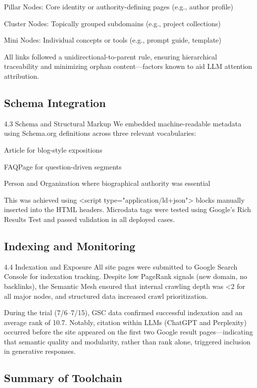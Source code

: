 Pillar Nodes: Core identity or authority-defining pages (e.g., author profile)

Cluster Nodes: Topically grouped subdomains (e.g., project collections)

Mini Nodes: Individual concepts or tools (e.g., prompt guide, template)

All links followed a unidirectional-to-parent rule, ensuring hierarchical traceability and minimizing orphan content—factors known to aid LLM attention attribution.

\subsection{Schema Integration}

4.3 Schema and Structural Markup
We embedded machine-readable metadata using Schema.org definitions across three relevant vocabularies:

Article for blog-style expositions

FAQPage for question-driven segments

Person and Organization where biographical authority was essential

This was achieved using <script type="application/ld+json"> blocks manually inserted into the HTML headers. Microdata tags were tested using Google’s Rich Results Test and passed validation in all deployed cases.

\subsection{Indexing and Monitoring}

4.4 Indexation and Exposure
All site pages were submitted to Google Search Console for indexation tracking. Despite low PageRank signals (new domain, no backlinks), the Semantic Mesh ensured that internal crawling depth was <2 for all major nodes, and structured data increased crawl prioritization.

During the trial (7/6–7/15), GSC data confirmed successful indexation and an average rank of 10.7. Notably, citation within LLMs (ChatGPT and Perplexity) occurred before the site appeared on the first two Google result pages—indicating that semantic quality and modularity, rather than rank alone, triggered inclusion in generative responses.
\subsection{Summary of Toolchain}

